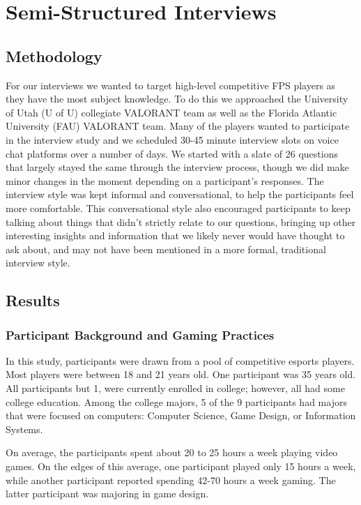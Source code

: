 \documentclass[sigconf]{acmart}
\begin{document}
\section{Semi-Structured Interviews}

\subsection{Methodology}
For our interviews we wanted to target high-level competitive FPS players as they have the most subject knowledge. To do this we approached the University of Utah (U of U) collegiate VALORANT team as well as the Florida Atlantic University (FAU) VALORANT team. Many of the players wanted to participate in the interview study and we scheduled 30-45 minute interview slots on voice chat platforms over a number of days. We started with a slate of 26 questions that largely stayed the same through the interview process, though we did make minor changes in the moment depending on a participant’s responses. The interview style was kept informal and conversational, to help the participants feel more comfortable. This conversational style also encouraged participants to keep talking about things that didn’t strictly relate to our questions, bringing up other interesting insights and information that we likely never would have thought to ask about, and may not have been mentioned in a more formal, traditional interview style.

\subsection{Results}
\subsubsection{Participant Background and Gaming Practices}

In this study, participants were drawn from a pool of competitive esports players. Most players were between 18 and 21 years old. One participant was 35 years old. All participants but 1, were currently enrolled in college; however, all had some college education. Among the college majors, 5 of the 9 participants had majors that were focused on computers: Computer Science, Game Design, or Information Systems.

On average, the participants spent about 20 to 25 hours a week playing video games. On the edges of this average, one participant played only 15 hours a week, while another participant reported spending 42-70 hours a week gaming. The latter participant was majoring in game design. 
\end{document}
